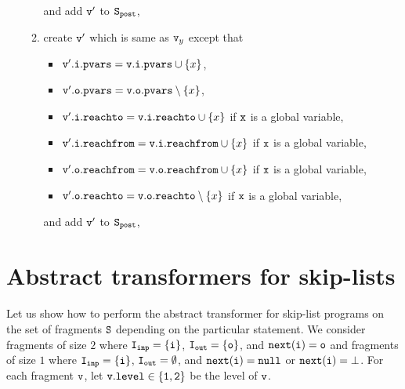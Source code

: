 \begin{itemize}
\begin{enumerate}
\begin{itemize}
\end{itemize}
and add $\tt v'$ to $\tt S_{post}$,
\item create $\tt v'$ which is same as $\mathtt{v}_y$ except that
\begin{itemize}
\item $\mathtt{v}'.\mathtt{i}.\mathtt{pvars} = \mathtt{v}.\mathtt{i}.\mathtt{pvars} \cup \left\{x\right\}$,
\item $\mathtt{v}'.\mathtt{o}.\mathtt{pvars} = \mathtt{v}.\mathtt{o}.\mathtt{pvars} \setminus \left\{x\right\}$,
\item $\mathtt{v}'.\mathtt{i}.\mathtt{reachto} = \mathtt{v}.\mathtt{i}.\mathtt{reachto} \cup \left\{x\right\}$ if $\tt x$ is a global variable,
 \item $\mathtt{v}'.\mathtt{i}.\mathtt{reachfrom} = \mathtt{v}.\mathtt{i}.\mathtt{reachfrom} \cup \left\{x\right\}$ if $\tt x$ is a global variable,
\item $\mathtt{v}'.\mathtt{o}.\mathtt{reachfrom} = \mathtt{v}.\mathtt{o}.\mathtt{reachfrom} \cup \left\{x\right\}$ if $\tt x$ is a global variable,
\item $\mathtt{v}'.\mathtt{o}.\mathtt{reachto} = \mathtt{v}.\mathtt{o}.\mathtt{reachto} \setminus \left\{x\right\}$ if $\tt x$ is a global variable,
\end{itemize}
and add $\tt v'$ to $\tt S_{post}$,
\end{enumerate}

	
	
	
	
	
	
	
	
	
	
	


\newpage

 \end{itemize}
\section{Abstract transformers for skip-lists}
Let us show how to perform the abstract transformer for skip-list programs on the set of fragments $\tt S$ depending on the particular statement.  We consider fragments of size $2$ where $\tt I_{inp} = \{i\}$, $\tt I_{out} = \{{o}\}$, and $\tt next(i) = {o}$ and fragments of size $1$ where $\tt I_{inp} = \{i\}$, $\tt I_{out} = \emptyset$, and $\tt next(i) = null$ or $\tt next(i) = \bot$. For each fragment $\tt v$, let $\tt v.level \in \{1,2\}$ be the level of $\tt v$.

